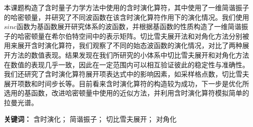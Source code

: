 
本课题构造了含时量子力学方法中使用的含时演化算符，其中使用了一维简谐振子的哈密顿量，并研究了不同波函数在该含时演化算符作用下的演化情况。我们使用$sinc$函数为基函数展开研究体系的波函数，并根据基函数的性质构造了一维简谐振子的哈密顿量在希尔伯特空间中的表示矩阵。切比雪夫展开法和对角化方法分别被用来展开含时演化算符，我们观察了不同的始态波函数的演化情况，对比了两种展开方法的数值表现。结果发现在我们所研究的小体系中切比雪夫展开和对角化方法在数值的表现几乎一致，因此在一定范围内可以相互验证彼此的稳定性与准确性。我们还研究了含时演化算符展开项表达式中的影响因素，如采样格点数，切比雪夫展开项数和时间步长等。目前看来含时演化算符的构造较为成功，下一步是优化所选用的基函数，改进哈密顿量中使用的近似方法，并利用含时演化算符模拟简单的拉曼光谱。

\bigskip
\noindent \textbf{关键词：\hspace{\Han}}
含时演化； \;
简谐振子； \;
切比雪夫展开； \;
对角化